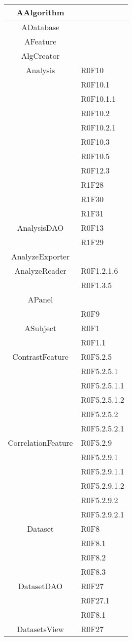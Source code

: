 \begin{center}
\begin{longtable}{|c|l|}
\hline 
AAlgorithm &  \\
\hline 
ADatabase &  \\
\hline 
AFeature &  \\
\hline 
AlgCreator &  \\
\hline 
Analysis & R0F10 \\
 & R0F10.1 \\
 & R0F10.1.1 \\
 & R0F10.2 \\
 & R0F10.2.1 \\
 & R0F10.3 \\
 & R0F10.5  \\
 & R0F12.3 \\
 & R1F28 \\
 & R1F30 \\
 & R1F31 \\
\hline 
AnalysisDAO & R0F13 \\
 & R1F29 \\
\hline 
AnalyzeExporter &  \\
\hline 
AnalyzeReader & R0F1.2.1.6 \\
 & R0F1.3.5 \\
\hline 
APanel &  \\
 & R0F9 \\
\hline 
ASubject & R0F1 \\
 & R0F1.1 \\
\hline 
ContrastFeature & R0F5.2.5 \\
 & R0F5.2.5.1 \\
 & R0F5.2.5.1.1 \\
 & R0F5.2.5.1.2 \\
 & R0F5.2.5.2 \\
 & R0F5.2.5.2.1 \\
\hline 
CorrelationFeature & R0F5.2.9 \\
 & R0F5.2.9.1 \\
 & R0F5.2.9.1.1 \\
 & R0F5.2.9.1.2 \\
 & R0F5.2.9.2 \\
 & R0F5.2.9.2.1 \\
\hline 
Dataset & R0F8 \\
 & R0F8.1  \\
 & R0F8.2  \\
 & R0F8.3  \\
\hline 
DatasetDAO & R0F27 \\
 & R0F27.1 \\
 & R0F8.1  \\
\hline 
DatasetsView & R0F27 \\

\end{longtable}
\end{center}

